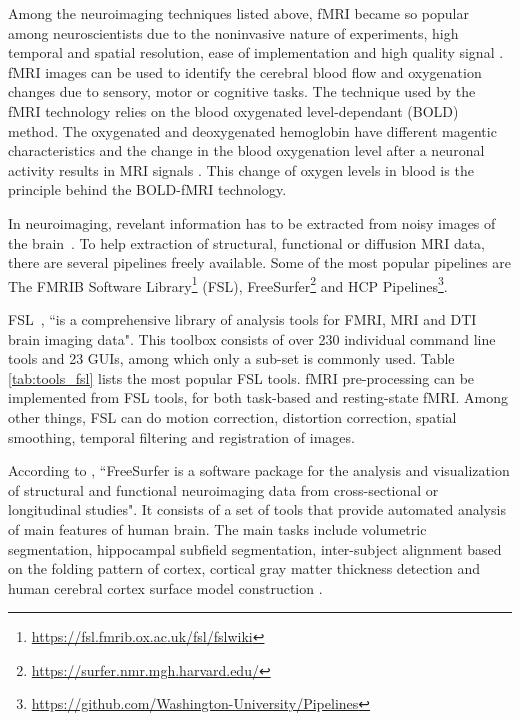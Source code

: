 Among the neuroimaging techniques listed above, fMRI became so popular among neuroscientists due to the noninvasive nature of experiments, high temporal and spatial resolution, ease of implementation and high quality signal \cite{Bandettini2009}. fMRI images can be used to identify the cerebral blood flow and oxygenation changes due to sensory, motor or cognitive tasks. The technique used by the fMRI technology relies on the blood oxygenated level-dependant (BOLD) method. The oxygenated and deoxygenated hemoglobin have different magentic characteristics and the change in the blood oxygenation level after a neuronal activity results in MRI signals \cite{doi:10.1177/0883073807313047}. This change of oxygen levels in blood is the principle behind the BOLD-fMRI technology.


In neuroimaging, revelant information has to be extracted from noisy images of the brain~\cite{WOOLRICH2009S173}. To help extraction of structural, functional or diffusion MRI data, there are several pipelines freely available. Some of the most popular pipelines are The FMRIB Software Library\footnote{\url{https://fsl.fmrib.ox.ac.uk/fsl/fslwiki}} (FSL), FreeSurfer\footnote{\url{https://surfer.nmr.mgh.harvard.edu/}} and HCP Pipelines\footnote{\url{https://github.com/Washington-University/Pipelines}}.

FSL~\cite{JENKINSON2012782}, ``is a comprehensive library of analysis tools for FMRI, MRI and DTI brain imaging data". This toolbox consists of over 230 individual command line tools and 23 GUIs, among which only a sub-set is commonly used. Table \ref{tab:tools_fsl} lists the most popular FSL tools. fMRI pre-processing can be implemented from FSL tools, for both task-based and resting-state fMRI. Among other things, FSL can do motion correction, distortion correction, spatial smoothing, temporal filtering and registration of images.

According to \cite{freesurfer_website}, ``FreeSurfer is a software package for the analysis and visualization of structural and functional neuroimaging data from cross-sectional or longitudinal studies". It consists of a set of tools that provide automated analysis of main features of human brain. The main tasks include volumetric segmentation, hippocampal subfield segmentation, inter-subject alignment based on the folding pattern of cortex, cortical gray matter thickness detection and human cerebral cortex surface model construction \cite{Fischl2012}. 

